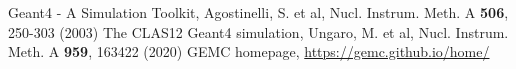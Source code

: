 %
% 
%
%
\begin{thebibliography}{}
%
%
Geant4 - A Simulation Toolkit, Agostinelli, S. et al, Nucl. Instrum. Meth. A \textbf{506}, 250-303 (2003)
%
The CLAS12 Geant4 simulation, Ungaro, M. et al, Nucl. Instrum. Meth. A \textbf{959}, 163422 (2020)
%
GEMC homepage, \url{https://gemc.github.io/home/}

\end{thebibliography}


